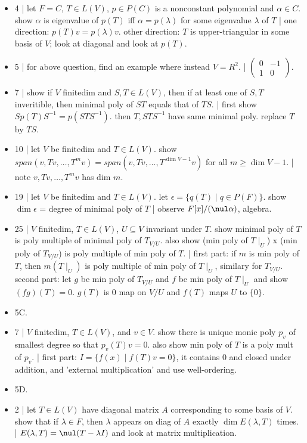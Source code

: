 \begin{itemize}
	\item 4 | let $F=C$, $T \in L(V)$, $p \in P(C)$ is a nonconstant polynomial and $\alpha \in C$. show $\alpha$ is eigenvalue of $p(T)$ iff $\alpha = p(\lambda)$ for some eigenvalue $\lambda$ of $T$ | one direction: $p(T)v = p(\lambda)v$. other direction: $T$ is upper-triangular in some basis of $V$; look at diagonal and look at $p(T)$. 
	\item 5 | for above question, find an example where instead $V = R^2$. | $\begin{pmatrix} 0 & -1 \\ 1 & 0 \end{pmatrix}$. 
	\item 7 | show if $V$ finitedim and $S,T \in L(V)$, then if at least one of $S,T$ inveritible, then minimal poly of $ST$ equals that of $TS$. | first show $Sp(T)S^{-1} = p(STS^{-1})$. then $T,STS^{-1}$ have same minimal poly. replace $T$ by $TS$. 
	\item 10 | let $V$ be finitedim and $T \in L(V)$. show $span(v,Tv,\dots,T^m v)=span(v,Tv,\dots,T^{\dim V - 1}v)$ for all $m \geq \dim V - 1$. | note $v,Tv,\dots,T^{m}v$ has dim $m$. 
	\item 19 | let $V$ be finitedim and $T \in L(V)$. let $\epsilon = \{q(T) \mid q \in P(F)\}$. show $\dim \epsilon$ = degree of minimal poly of $T$ | observe $F[x] / (\nul \alpha)$, algebra. 
	\item 25 | $V$ finitedim, $T \in L(V)$, $U \subseteq V$ invariant under $T$. show minimal poly of $T$ is poly multiple of minimal poly of $T_{V/U}$. also show (min poly of $T \mid_U$) x (min poly of $T_{V/U}$) is poly multiple of min poly of $T$. | first part: if $m$ is min poly of $T$, then $m(T \mid_U)$ is poly multiple of min poly of $T \mid_U$, similary for $T_{V/U}$. second part: let $g$ be min poly of $T_{V/U}$ and $f$ be min poly of $T \mid_U$ and show $(fg)(T)=0$. $g(T)$ is 0 map on $V/U$ and $f(T)$ maps $U$ to $\{0\}$. 
	\item 5C. 
	\item 7 | $V$ finitedim, $T \in L(V)$, and $v \in V$. show there is unique monic poly $p_v$ of smallest degree so that $p_v(T)v=0$. also show min poly of $T$ is a poly mult of $p_v$. | first part: $I = \{f(x) \mid f(T)v=0\}$, it contains 0 and closed under addition, and 'external multiplication' and use well-ordering. 
	\item 5D. 
	\item 2 | let $T \in L(V)$ have diagonal matrix $A$ corresponding to some basis of $V$. show that if $\lambda \in F$, then $\lambda$ appears on diag of $A$ exactly $\dim E(\lambda,T)$ times. | $E(\lambda,T) = \nul (T-\lambda I)$ and look at matrix multiplication. 

\end{itemize}
